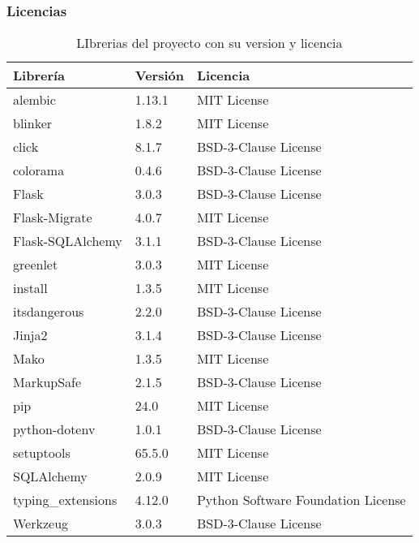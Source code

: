 \subsubsection{Licencias}
\begin{table}[]
    \centering
    \begin{tabular}{@{}|l|l|l|@{}}
        \toprule
        \textbf{Librería} & \textbf{Versión} & \textbf{Licencia} \\ \hline
        alembic & 1.13.1 & MIT License \\ \midrule
        blinker &1.8.2 & MIT License \\ \midrule
        click & 8.1.7 & BSD-3-Clause License \\ \midrule
        colorama & 0.4.6 & BSD-3-Clause License \\ \midrule
        Flask & 3.0.3 & BSD-3-Clause License \\ \midrule
        Flask-Migrate & 4.0.7 & MIT License \\ \midrule
        Flask-SQLAlchemy & 3.1.1 & BSD-3-Clause License \\ \midrule
        greenlet & 3.0.3 & MIT License \\ \midrule
        install & 1.3.5 & MIT License \\ \midrule
        itsdangerous & 2.2.0 & BSD-3-Clause License \\ \midrule
        Jinja2 & 3.1.4 & BSD-3-Clause License \\ \midrule
        Mako & 1.3.5 & MIT License \\ \midrule
        MarkupSafe & 2.1.5 & BSD-3-Clause License \\ \midrule
        pip & 24.0 & MIT License \\ \midrule
        python-dotenv & 1.0.1 & BSD-3-Clause License \\ \midrule
        setuptools & 65.5.0 & MIT License \\ \midrule
        SQLAlchemy & 2.0.9 & MIT License \\ \midrule
        typing\_extensions &4.12.0 & Python Software Foundation License \\ \midrule
        Werkzeug & 3.0.3 & BSD-3-Clause License \\ \bottomrule 
    \end{tabular}
    \caption{LIbrerias del proyecto con su version y licencia}
\end{table}

